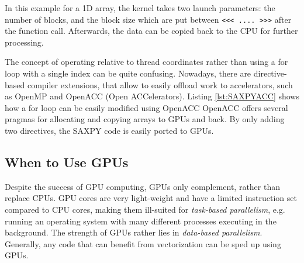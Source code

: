 In this example for a 1D array, the kernel takes two launch parameters: the number of blocks, and the block size which are put between \texttt{<<< .... >>>} after the function call. Afterwards, the data can be copied back to the CPU for further processing. 

The concept of operating relative to thread coordinates rather than using a for loop with a single index can be quite confusing. Nowadays, there are directive-based compiler extensions, that allow to easily offload work to accelerators, such as OpenMP and OpenACC (Open ACCelerators). Listing \ref{lst:SAXPYACC} shows how a for loop can be easily modified using OpenACC
\noindent OpenACC offers several pragmas for allocating and copying arrays to GPUs and back. By only adding two directives, the SAXPY code is easily ported to GPUs. 

\subsection{When to Use GPUs}

Despite the success of GPU computing, GPUs only complement, rather than replace CPUs. GPU cores are very light-weight and have a limited instruction set compared to CPU cores, making them ill-suited for \emph{task-based parallelism}, e.g. running an operating system with many different processes executing in the background. The strength of GPUs rather lies in \emph{data-based parallelism}. Generally, any code that can benefit from vectorization can be sped up using GPUs. 
